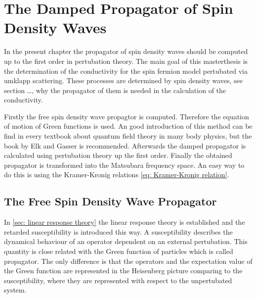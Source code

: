 %
%
%
\chapter{The Damped Propagator of Spin Density Waves}
\label{ch: propagator}
%
%
%
In the present chapter the propagator of spin density waves should be computed up to the first order in pertubation theory.
The main goal of this masterthesis is the determination of the conductivity for the spin fermion model pertubated via umklapp scattering.
These processes are determined by spin density waves, see section \dots {}, why the propagator of them is needed in the calculation of the conductivity.

Firstly the free spin density wave propagtor is computed.
Therefore the equation of motion of Green functions is used. 
An good introduction of this method can be find in every textbook about quantum field theory in many body physics, but the book by Elk and Gasser \cite{Elk&Gasser} is recommended.
Afterwards the damped propagator is calculated using pertubation theory up the first order.
Finally the obtained propagator is transformed into the Matsubara frequency space.
An easy way to do this is using the Kramer-Kronig relations \eqref{eq: Kramer-Kronig relation}.
%
%
\section{The Free Spin Density Wave Propagator}
\label{sec: free propagator}
%
%
In \ref{sec: linear response theory} the linear response theory is established and the retarded susceptibility is introduced this way.
A susceptibility describes the dynamical behaviour of an operator dependent on an external pertubation.
This quantity is close related with the Green function of particles which is called propagator.
The only difference is that the operators and the expectation value of the Green function are represented in the Heisenberg picture comparing to the susceptibility, where they are represented with respect to the unpertubated system.

